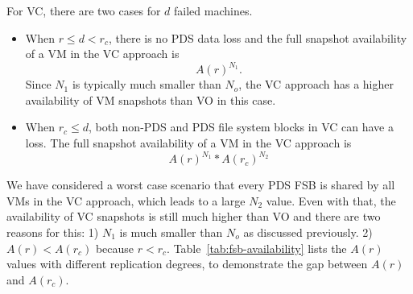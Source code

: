 For VC, there are two cases for $d$ failed machines.
\begin{itemize}
\item
When $r \le d<r_c$,  there is no PDS data loss and  
the full snapshot availability of a VM in the VC approach is 
\[
A(r)^{N_1}.
\]
Since $N_1$ is typically much smaller than $N_o$, 
the VC approach has a higher availability of VM snapshots than VO in this case.

\item
When $r_c \leq d$, both non-PDS and PDS file system blocks in VC can have a loss.
The full snapshot availability of  a VM in the VC approach is
\[
A(r)^{N_1} * A(r_c)^{N_2}
\]
\end{itemize} 
We have considered a worst case scenario that
every PDS FSB is shared by all VMs in the VC approach, which leads to a large $N_2$ value. 
Even with that, the availability of VC snapshots is still much higher than VO and  
there are two reasons for this:  1) $N_1$ is much smaller than $N_o$ as discussed previously.
2)  $A(r) < A(r_c)$ because $r < r_c$.  
Table~\ref{tab:fsb-availability} lists the $A(r)$ values with
different replication degrees, to demonstrate the gap between  $A(r)$ and  $A(r_c)$.


